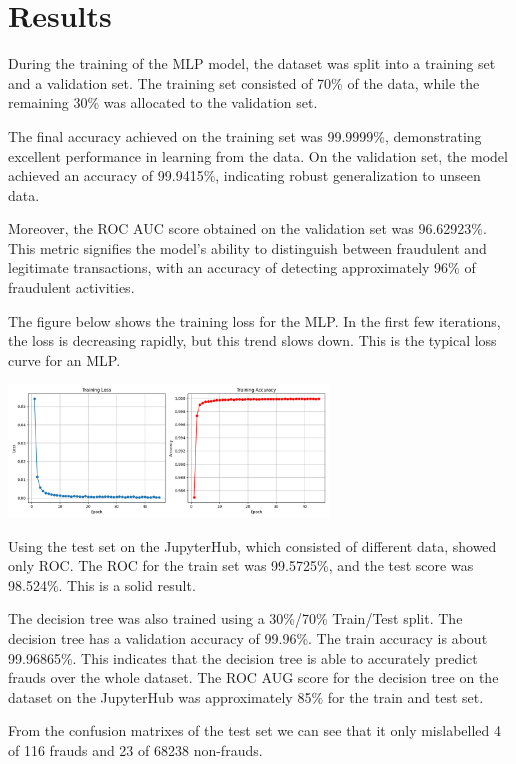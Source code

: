 \documentclass[a4paper, 10pt, conference]{ieeeconf}      %
\begin{document}
\section{Results}
\label{sec:results}
During the training of the MLP model, the dataset was split into a training set and a validation set. The training set consisted of 70\% of the data, while the remaining 30\% was allocated to the validation set.

The final accuracy achieved on the training set was 99.9999\%, demonstrating excellent performance in learning from the data. On the validation set, the model achieved an accuracy of 99.9415\%, indicating robust generalization to unseen data.

Moreover, the ROC AUC score obtained on the validation set was 96.62923\%. This metric signifies the model's ability to distinguish between fraudulent and legitimate transactions, with an accuracy of detecting approximately 96\% of fraudulent activities.

The figure below shows the training loss for the MLP. In the first few iterations, the loss is decreasing rapidly, but this trend slows down. This is the typical loss curve for an MLP. 
\begin{center}
  \includegraphics[width=8.5cm]{../data/mlp-plot.png} \label{mlp-plot}
\end{center}

Using the test set on the JupyterHub, which consisted of different data, showed only ROC. The ROC for the train set was 99.5725\%, and the test score was 98.524\%. This is a solid result.

The decision tree was also trained using a 30\%/70\% Train/Test split.
The decision tree has a validation accuracy of 99.96\%. The train accuracy is about 99.96865\%. This indicates that the decision tree is able to accurately predict frauds over the whole dataset. 
The ROC AUG score for the decision tree on the dataset on the JupyterHub was approximately 85\% for the train and test set. 

From the confusion matrixes of the test set we can see that it only mislabelled 4 of 116 frauds and 23 of 68238 non-frauds.
\end{document}
